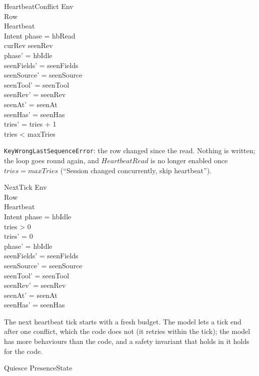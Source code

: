 \documentclass[a4paper,10pt,fleqn]{article}
\begin{document}
\begin{schema}{HeartbeatConflict}
  \Xi Env \\
  \Xi Row \\
  \Delta Heartbeat \\
  \Xi Intent
  \where
  phase = hbRead \\
  curRev \neq seenRev \\
  phase' = hbIdle \\
  seenFields' = seenFields \\
  seenSource' = seenSource \\
  seenTool' = seenTool \\
  seenRev' = seenRev \\
  seenAt' = seenAt \\
  seenHas' = seenHas \\
  tries' = tries + 1 \\
  tries < maxTries
\end{schema}

\texttt{KeyWrongLastSequenceError}: the row changed since the read.  Nothing
is written; the loop goes round again, and $HeartbeatRead$ is no longer
enabled once $tries = maxTries$ (``Session changed concurrently, skip
heartbeat'').

\begin{schema}{NextTick}
  \Xi Env \\
  \Xi Row \\
  \Delta Heartbeat \\
  \Xi Intent
  \where
  phase = hbIdle \\
  tries > 0 \\
  tries' = 0 \\
  phase' = hbIdle \\
  seenFields' = seenFields \\
  seenSource' = seenSource \\
  seenTool' = seenTool \\
  seenRev' = seenRev \\
  seenAt' = seenAt \\
  seenHas' = seenHas
\end{schema}

The next heartbeat tick starts with a fresh budget.  The model lets a tick
end after one conflict, which the code does not (it retries within the tick);
the model has more behaviours than the code, and a safety invariant that holds
in it holds for the code.

\begin{schema}{Quiesce}
  \Xi PresenceState
\end{schema}
\end{document}
